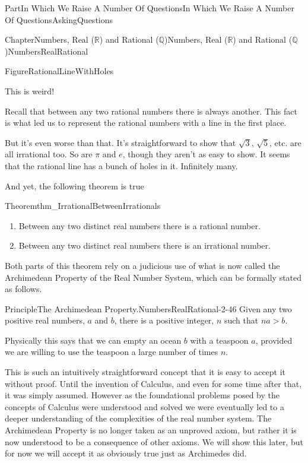 \documentclass[oneside,10pt,]{book}
\numberwithin{equation}{part}
\newcommand{\RR}{\mathbb {R}}
\newcommand{\QQ}{\mathbb {Q}}
\begin{document}
\begin{partptx}{Part}{In Which We Raise A Number Of Questions}{}{In Which We Raise A Number Of Questions}{}{}{AskingQuestions}
\begin{chapterptx}{Chapter}{Numbers, Real (\(\RR\)) and Rational (\(\QQ\))}{}{Numbers, Real (\(\RR\)) and Rational (\(\QQ\))}{}{}{NumbersRealRational}
\begin{introduction}{}
\begin{figureptx}{Figure}{}{RationalLineWithHoles}{}
\begin{image}{0}{1}{0}{}
\end{image}%
\tcblower
\end{figureptx}%
This is weird!%
\par
Recall that between any two rational numbers there is always another. This fact is what led us to represent the rational numbers with a line in the first place.%
\par
But it's even worse than that. It's straightforward to show that \(\sqrt{3}\), \(\sqrt{5}\), etc. are all irrational too. So are \(\pi\) and \(e\), though they aren't as easy to show. It seems that the rational line has a bunch of holes in it. Infinitely many.%
\par
And yet, the following theorem is true%
\begin{theorem}{Theorem}{}{}{thm_IrrationalBetweenIrrationals}%
\index{\(\RR\)!real numbers exist between real numbers}%
\begin{enumerate}[label={(\alph*)}]
\item{}Between any two distinct real numbers there is a rational number.%
\item{}Between any two distinct real numbers there is an irrational number.%
\end{enumerate}
%
\end{theorem}
Both parts of this theorem rely on a judicious use of what is now called the Archimedean Property of the Real Number System, which can be formally stated as follows.%
\begin{principle}{Principle}{The Archimedean Property.}{}{NumbersRealRational-2-46}%
 Given any two positive real numbers, \(a\) and \(b\), there is a positive integer, \(n\) such that \(na>b\).%
\end{principle}
Physically this says that we can empty an ocean \(b\) with a teaspoon \(a\), provided we are willing to use the teaspoon a large number of times \(n\).%
\par
This is such an intuitively straightforward concept that it is easy to accept it without proof. Until the invention of Calculus, and even for some time after that, it was simply assumed. However as the foundational problems posed by the concepts of Calculus were understood and solved we were eventually led to a deeper understanding of the complexities of the real number system. The Archimedean Property is no longer taken as an unproved axiom, but rather it is now understood to be a consequence of other axioms. We will show this later, but for now we will accept it as obviously true just as Archimedes did.%

\end{introduction}
\end{chapterptx}
\end{partptx}
\end{document}
